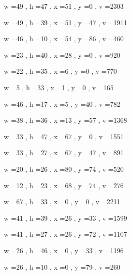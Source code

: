 \documentclass[11pt]{article}
\begin{document}
w =49 , h =47 , x =51 , y =0 , v =2303
\par
w =49 , h =39 , x =51 , y =47 , v =1911
\par
w =46 , h =10 , x =54 , y =86 , v =460
\par
w =23 , h =40 , x =28 , y =0 , v =920
\par
w =22 , h =35 , x =6 , y =0 , v =770
\par
w =5 , h =33 , x =1 , y =0 , v =165
\par
w =46 , h =17 , x =5 , y =40 , v =782
\par
w =38 , h =36 , x =13 , y =57 , v =1368
\par
\newpage




w =33 , h =47 , x =67 , y =0 , v =1551
\par
w =33 , h =27 , x =67 , y =47 , v =891
\par
w =20 , h =26 , x =80 , y =74 , v =520
\par
w =12 , h =23 , x =68 , y =74 , v =276
\par
w =67 , h =33 , x =0 , y =0 , v =2211
\par
w =41 , h =39 , x =26 , y =33 , v =1599
\par
w =41 , h =27 , x =26 , y =72 , v =1107
\par
w =26 , h =46 , x =0 , y =33 , v =1196
\par
w =26 , h =10 , x =0 , y =79 , v =260
\par
\newpage
\end{document}
